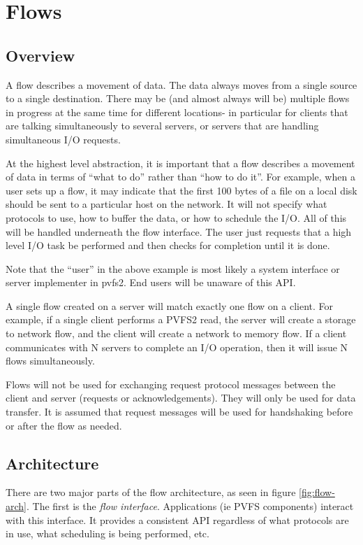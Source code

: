 \documentclass[12pt]{article} %
\begin{document}
\section{Flows}

\subsection{Overview}

A flow describes a movement of data.  The data always moves from a single
source to a single destination.  There may be (and almost always will be)
multiple flows in progress at the same time for different locations-
in particular for clients that are talking simultaneously to several
servers, or servers that are handling simultaneous I/O requests.

At the highest level abstraction, it is important that a flow describes
a movement of data in terms of ``what to do'' rather than ``how to do
it''.  For example, when a user sets up a flow, it may indicate that the
first 100 bytes of a file on a local disk should be sent to
a particular host on the network.  It will not specify what protocols to
use, how to buffer the data, or how to schedule the I/O.  All of this will be
handled underneath the flow interface.  The user just requests that a
high level I/O task be performed and then checks for completion until it
is done.

Note that the ``user'' in the above example is most likely a
system interface or server implementer in pvfs2.  End users will
be unaware of this API.

A single flow created on a server will match exactly one flow on a
client.  For example, if a single client performs a PVFS2 read, the
server will create a storage to network flow, and the client will
create a network to memory flow.  If a client communicates with N servers 
to complete an I/O operation, then it will issue N flows simultaneously.

Flows will not be used for exchanging request protocol messages
between the client and server (requests or acknowledgements).
They will only be used for data transfer.  It is assumed that request
messages will be used for handshaking before or after the flow as 
needed.

\subsection{Architecture}
\label{sec:arch}

There are two major parts of the flow architecture, as seen in figure
\ref{fig:flow-arch}.  The first is the
\emph{flow interface}.  Applications (ie PVFS components) interact with
this interface.  It provides a consistent API regardless of what
protocols are in use, what scheduling is being performed, etc.  
\end{document}
